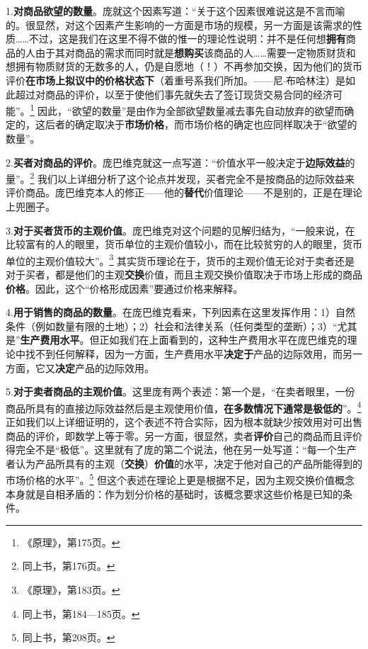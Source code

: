 \documentclass[fontset=fandol, a4paper, 12pt, openright]{ctexbook}
\begin{document}
1.\textbf{对商品欲望的数量}。庞就这个因素写道：“关于这个因素很难说这是不言而喻的。很显然，对这个因素产生影响的一方面是市场的规模，另一方面是该需求的性质……不过，这是我们在这里不得不做的惟一的理论性说明：并不是任何想\textbf{拥有}商品的人由于其对商品的需求而同时就是\textbf{想购买}该商品的人……需要一定物质财货和想拥有物质财货的无数多的人，仍是自愿地（！）不再参加交换，因为他们的货币评价\textbf{在市场上拟议中的价格状态下}（着重号系我们所加。——尼$\cdot$布哈林注）是如此超过对商品的评价，以至于使他们事先就失去了签订现货交易合同的经济可能”。\footnote{《原理》，第175页。} 因此，“欲望的数量”是由作为全部欲望数量减去事先自动放弃的欲望而确定的，这后者的确定取决于\textbf{市场价格}，而市场价格的确定也应同样取决于“欲望的数量”。

2.\textbf{买者对商品的评价}。庞巴维克就这一点写道：“价值水平一般决定于\textbf{边际效益}的量”。\footnote{同上书，第176页。} 我们以上详细分析了这个论点并发现，买者完全不是按商品的边际效益来评价商品。庞巴维克本人的修正——他的\textbf{替代}价值理论——不是别的，正是在理论上兜圈子。

3.\textbf{对于买者货币的主观价值}。庞巴维克对这个问题的见解归结为，“一般来说，在比较富有的人的眼里，货币单位的主观价值较小，而在比较贫穷的人的眼里，货币单位的主观价值较大”。\footnote{《原理》，第183页。} 其实货币理论在于，货币的主观价值无论对于卖者还是对于买者，都是他们的主观\textbf{交换}价值，而且主观交换价值取决于市场上形成的商品\textbf{价格}。因此，这个“价格形成因素”要通过价格来解释。

4.\textbf{用于销售的商品的数量}。在庞巴维克看来，下列因素在这里发挥作用：1）自然条件（例如数量有限的土地）；2）社会和法律关系（任何类型的垄断）；3）“尤其是”\textbf{生产费用水平}。但正如我们在上面看到的，这种生产费用水平在庞巴维克的理论中找不到任何解释，因为一方面，生产费用水平\textbf{决定于}产品的边际效用，而另一方面，它又\textbf{决定}产品的边际效用。

5.\textbf{对于卖者商品的主观价值}。这里庞有两个表述：第一个是，“在卖者眼里，一份商品所具有的直接边际效益然后是主观使用价值，\textbf{在多数情况下通常是极低的}”。\footnote{同上书，第184—185页。} 正如我们以上详细证明的，这个表述不符合实际，因为根本就缺少按效用对可出售商品的评价，即数学上等于零。另一方面，很显然，卖者\textbf{评价}自己的商品而且评价得完全不是“极低”。这里就有了庞的第二个说法，他在另一处写道：“每一个生产者认为产品所具有的主观（\textbf{交换}）\textbf{价值}的水平，决定于他对自己的产品所能得到的市场价格的水平”。\footnote{同上书，第208页。} 但这个表述在理论上更是根据不足，因为主观交换价值概念本身就是自相矛盾的：作为划分价格的基础时，该概念要求这些价格是已知的条件。
\end{document}
